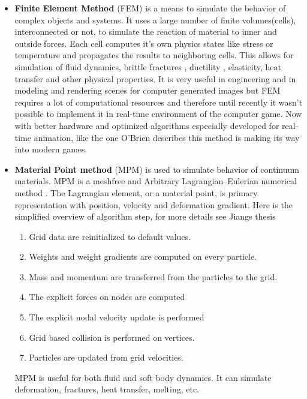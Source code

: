 \begin{itemize}

\item \textbf{Finite Element Method} (FEM) is a means to simulate the behavior of complex objects and systems.  It uses a large number of finite volumes(cells), interconnected or not, to simulate the reaction of material to inner and outside forces. Each cell computes it's own physics states like stress or temperature and propagates the results to neighboring cells. This allows for simulation of fluid dynamics, brittle fractures \cite{brittlefracture}, ductility \cite{ductilefracture}, elasticity, heat transfer and other physical properties. It is very useful in engineering and in modeling and rendering scenes for computer generated images but FEM requires a lot of computational resources and therefore until recently it wasn't possible to implement it in real-time environment of the computer game. Now with better hardware and optimized algorithms especially developed for real-time animation, like the one O'Brien \cite{femingames} describes this method is making its way into modern games.

\item \textbf{Material Point method} (MPM) is used to simulate behavior of continuum materials. MPM is a meshfree and Arbitrary Lagrangian–Eulerian numerical method \cite{ALE}. The Lagrangian element, or a material point, is  primary representation with position, velocity and deformation gradient. Here is the simplified overview of algorithm step, for more details see Jiangs thesis\cite{jiang2015material} 
\begin{enumerate}
	\item Grid data are reinitialized to default values.
    \item Weights and weight gradients are computed on every particle.
    \item Mass and momentum are transferred from the particles to the grid.
    \item The explicit forces on nodes are computed
    \item The explicit nodal velocity update is performed
    \item Grid based collision is performed on vertices.
    \item Particles are updated from grid velocities.
\end{enumerate}
MPM is useful for both fluid and soft body dynamics. It can simulate deformation, fractures, heat transfer, melting, etc.


\end{itemize}
